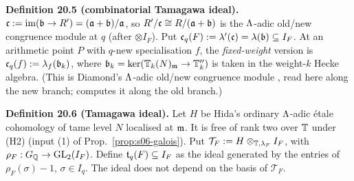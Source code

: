 \medskip
\noindent{}\label{rpt:def:s06-ctam}\textbf{Definition 20.5 (combinatorial Tamagawa ideal).}
$\mathfrak{c}:=\mathrm{im}(\mathfrak{b}\to R')=(\mathfrak{a}+\mathfrak{b})/\mathfrak{a}$, so $R'/\mathfrak{c}\cong R/(\mathfrak{a}+\mathfrak{b})$ is the $\Lambda$-adic old/new congruence module at $q$
(after $\otimes I_F$). Put $\mathfrak{c}_q(F):=\lambda'(\mathfrak{c})=\lambda(\mathfrak{b})\subseteq I_F$. At an arithmetic point $P$ with $q$-new
specialisation $f$, the \emph{fixed-weight} version is $\mathfrak{c}_q(f):=\lambda_f(\mathfrak{b}_k)$, where $\mathfrak{b}_k=\ker(\mathbb{T}_k(N)_{\mathfrak{m}}\to\mathbb{T}''_k)$ is taken
in the weight-$k$ Hecke algebra. 
(This is Diamond's $\Lambda$-adic old/new congruence module \cite{Dia89}, read here along the new branch; \cite[Thm.~6A--6C, p.~80]{Dia89}
\stcited{} computes it along the old branch.)

\medskip
\noindent{}\label{rpt:def:s06-tam}\textbf{Definition 20.6 (Tamagawa ideal).}
Let $H$ be Hida's ordinary $\Lambda$-adic étale cohomology of tame level $N$ localised at $\mathfrak{m}$. It is free of rank two over $\mathbb{T}$
under (H2) (input (1) of Prop.~\ref{prop:s06-galois}). Put $\mathcal T_F:=H\otimes_{\mathbb{T},\lambda_F}I_F$, with
$\rho_F:G_{\mathbb{Q}}\to\mathrm{GL}_2(I_F)$. Define $\mathfrak{t}_q(F)\subseteq I_F$ as the ideal generated by the entries of $\rho_F(\sigma)-1$,
$\sigma\in I_q$. The ideal does not depend on the basis of $\mathcal T_F$. 

